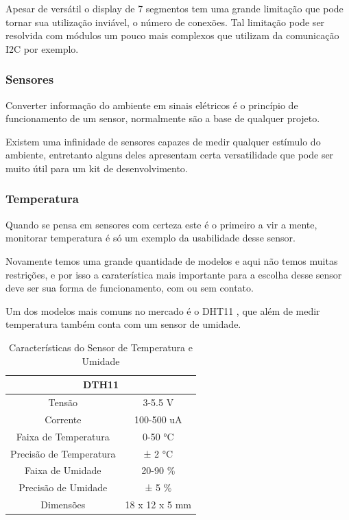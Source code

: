 Apesar de versátil o display de 7 segmentos tem uma grande limitação que pode tornar sua utilização inviável, o número de conexões. Tal limitação pode ser resolvida com módulos um pouco mais complexos que utilizam da comunicação I2C por exemplo.

\subsubsection{Sensores}

Converter informação do ambiente em sinais elétricos é o princípio de funcionamento de um sensor, normalmente são a base de qualquer projeto.

Existem uma infinidade de sensores capazes de medir qualquer estímulo do ambiente, entretanto alguns deles apresentam certa versatilidade que pode ser muito útil para um kit de desenvolvimento.

\subsubsection*{Temperatura}

Quando se pensa em sensores com certeza este é o primeiro a vir a mente, monitorar temperatura é só um exemplo da usabilidade desse sensor.

Novamente temos uma grande quantidade de modelos e aqui não temos muitas restrições, e por isso a caraterística mais importante para a escolha desse sensor deve ser sua forma de funcionamento, com ou sem contato.

Um dos modelos mais comuns no mercado é o DHT11 \cite{AOSONG2010}, que além de medir temperatura também conta com um sensor de umidade.

\begin{table}[h!]
\centering
\begin{tabular}{|c|c|}
\hline
\multicolumn{2}{|c|}{DTH11}              \\ \hline
Tensão                  & 3-5.5 V        \\ \hline
Corrente                & 100-500 uA     \\ \hline
Faixa de Temperatura    & 0-50 °C        \\ \hline
Precisão de Temperatura & ± 2 °C         \\ \hline
Faixa de Umidade        & 20-90 \%       \\ \hline
Precisão de Umidade     & ± 5 \%         \\ \hline
Dimensões               & 18 x 12 x 5 mm \\ \hline
\end{tabular}
\caption{Características do Sensor de Temperatura e Umidade}
\label{tab:temp}
\end{table}

